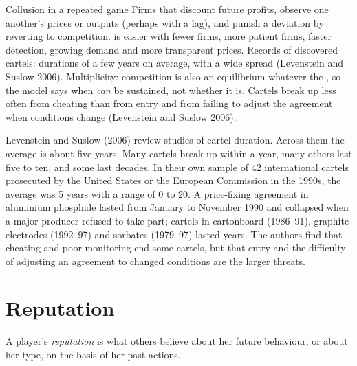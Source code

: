 \begin{model}{Collusion in a repeated game}
\assumes Firms that discount future profits, observe one another's prices or outputs (perhaps with a lag),
and punish a deviation by reverting to competition.
\predicts {} is easier with fewer firms, more patient firms, faster detection, growing demand and more
transparent prices.
\tested Records of discovered cartels: durations of a few years on average, with a wide spread (Levenstein
and Suslow 2006).
\breaks Multiplicity: competition is also an equilibrium whatever the , so the model says when
 \emph{can} be sustained, not whether it is. Cartels break up less often from cheating than from entry
and from failing to adjust the agreement when conditions change (Levenstein and Suslow 2006).
\end{model}

\begin{record}
Levenstein and Suslow (2006) review studies of cartel duration. Across them the average is about five years. Many
cartels break up within a year, many others last five to ten, and some last decades. In their own sample of 42
international cartels prosecuted by the United States or the European Commission in the 1990s, the average was
5 years with a range of 0 to 20. A price-fixing agreement in aluminium phosphide lasted from January to November
1990 and collapsed when a major producer refused to take part; cartels in cartonboard (1986--91), graphite
electrodes (1992--97) and sorbates (1979--97) lasted years. The authors find that cheating and poor monitoring
end some cartels, but that entry and the difficulty of adjusting an agreement to changed conditions are the
larger threats.
\end{record}

\section{Reputation}\label{sec:b2:repeated-games:reputation}

\begin{definition}[Reputation]\label{def:b2:repeated-games:reputation}
A player's \emph{reputation} is what others believe about her future behaviour, or about
her type, on the basis of her past actions.
\end{definition}

